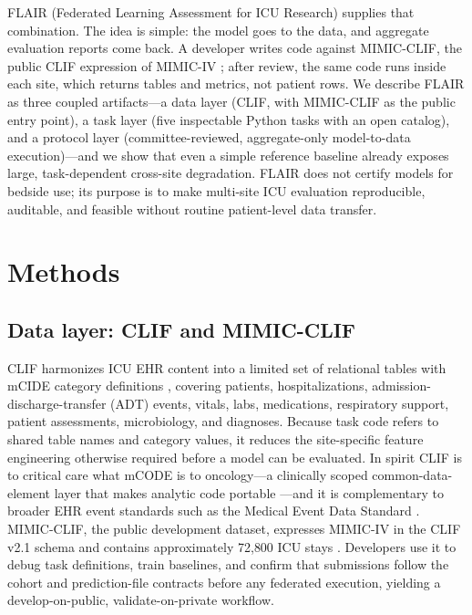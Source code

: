 \documentclass[12pt]{article}
\begin{document}
FLAIR (Federated Learning Assessment for ICU Research) supplies that combination. The idea is simple: the model goes to the data, and aggregate evaluation reports come back. A developer writes code against MIMIC-CLIF, the public CLIF expression of MIMIC-IV \citep{johnson2023mimiciv,johnson2016mimiciii}; after review, the same code runs inside each site, which returns tables and metrics, not patient rows. We describe FLAIR as three coupled artifacts---a data layer (CLIF, with MIMIC-CLIF as the public entry point), a task layer (five inspectable Python tasks with an open catalog), and a protocol layer (committee-reviewed, aggregate-only model-to-data execution)---and we show that even a simple reference baseline already exposes large, task-dependent cross-site degradation. FLAIR does not certify models for bedside use; its purpose is to make multi-site ICU evaluation reproducible, auditable, and feasible without routine patient-level data transfer.

\section{Methods}
\label{sec:methods}

\subsection*{Data layer: CLIF and MIMIC-CLIF}

CLIF harmonizes ICU EHR content into a limited set of relational tables with mCIDE category definitions \citep{rojas2025clif}, covering patients, hospitalizations, admission-discharge-transfer (ADT) events, vitals, labs, medications, respiratory support, patient assessments, microbiology, and diagnoses. Because task code refers to shared table names and category values, it reduces the site-specific feature engineering otherwise required before a model can be evaluated. In spirit CLIF is to critical care what mCODE is to oncology---a clinically scoped common-data-element layer that makes analytic code portable \citep{mcode2024hl7}---and it is complementary to broader EHR event standards such as the Medical Event Data Standard \citep{arnrich2025meds}. MIMIC-CLIF, the public development dataset, expresses MIMIC-IV in the CLIF v2.1 schema and contains approximately 72{,}800 ICU stays \citep{johnson2023mimiciv}. Developers use it to debug task definitions, train baselines, and confirm that submissions follow the cohort and prediction-file contracts before any federated execution, yielding a develop-on-public, validate-on-private workflow.
\end{document}
